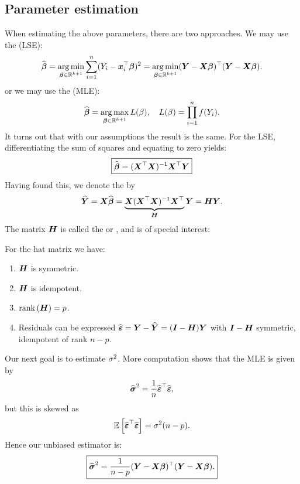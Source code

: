 \subsection{Parameter estimation}
When estimating the above parameters, there are two approaches. We may use the  (LSE): 
$$
    \Bh 
    = \argmin_{\B\in\R^{k+1}} \sum_{i=1}^n (Y_i-\x_i^\top\B)^2
    = \argmin_{\B\in\R^{k+1}} (\Y-\X\B)^\top(\Y-\X\B).
$$
or we may use the  (MLE):
$$
    \Bh 
    = \argmax_{\B\in\R^{k+1}} L(\beta), \quad L(\beta) = \prod_{i=1}^n f(Y_i).
$$
It turns out that with our assumptions the result is the same. For the LSE, differentiating the sum of squares and equating to zero yields:
\begin{equation}
    \boxed{\Bh = (\X^\top\X)^{-1}\X^\top\Y }
\end{equation}
Having found this, we denote the  by 
$$
    \hat{\Y} = \X\Bh = \underbrace{\X(\X^\top \X)^{-1}\X^\top}_{\mH}\Y = \mH\Y.
$$
The matrix $\mH$ is called the  or , and is of special interest:
\begin{proposition}
    For the hat matrix we have:
    \begin{enumerate}
        \item $\mH$ is symmetric.
        \item $\mH$ is idempotent.
        \item $\rank{\mH} = p$.
        \item Residuals can be expressed $\Eh=\Y-\hat{\Y} = (\mI-\mH)\Y$ with $\mI-\mH$ symmetric, idempotent of rank $n-p$.
    \end{enumerate}
\end{proposition}
Our next goal is to estimate $\s^2$. More computation shows that the MLE is given by 
$$
    \Sh^2 = \frac{1}{n}\Eh^\top\Eh,
$$ 
but this is skewed as 
$$
    \ev{\Eh^\top\Eh}=\s^2(n-p).
$$
Hence our unbiased estimator is:
\begin{equation}
    \boxed{
        \Sh^2 = \frac{1}{n-p}(\Y-\X\B)^\top(\Y-\X\B).
    }    
\end{equation}

